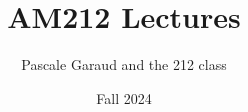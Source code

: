 \documentclass[oneside]{book}
\title{AM212 Lectures}
\author{Pascale Garaud and the 212 class}
\date{Fall 2024}
\begin{document}
\newcommand{\grad}{\nabla}
\renewcommand{\div}{\nabla\cdot}
\newcommand{\curl}{\nabla\times}
\newcommand{\pp}[2]{\frac{\partial #1}{\partial #2}}
\newcommand{\ppt}[2]{\frac{\partial^2 #1}{\partial #2^2}}


\maketitle

 

%
%
%
%
%
%

\end{document}

